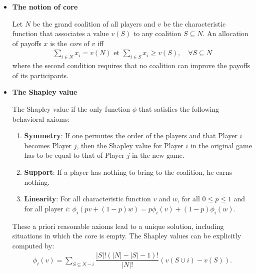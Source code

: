 \documentclass{../ape}
\begin{document}
\begin{itemize}[leftmargin=*]
\renewcommand{\labelitemi}{$\bullet$}

	
	\item \textbf{The notion of core}
	\vspace{.3cm}

	Let $N$ be the grand coalition of all players and $v$ be the characteristic function that associates a value $v (S)$ to any coalition $S \subseteq N$. An allocation of payoffs $x$ is the \emph{core} of $v$ iff
	\begin{align*}
		\sum_{i \in N}{x_i} = v(N) \text{ et } \sum_{i\in S}{x_i} \geq v(S), \quad \forall S \subseteq N
	\end{align*} 
	where the second condition requires that no coalition can improve the payoffs of its participants.

	\vspace{.3cm}
	\item \textbf{The Shapley value}
	\vspace{.3cm}
	
	The Shapley value if the only function $\phi$ that satisfies the following behavioral axioms:
	\begin{enumerate}
		\item \textbf{Symmetry}: If one permutes the order of the players and that Player $i$ becomes Player $j$, then the Shapley value for Player $i$ in the original game has to be equal to that of Player $j$ in the new game.
		\item \textbf{Support}: If a player has nothing to bring to the coalition, he earns nothing.
		\item \textbf{Linearity}: For all characteristic function $v$ and $w$, for all $0 \leq p \leq 1$ and for all player $i$: $\phi_i(pv + (1-p)w) = p\phi_i(v) + (1-p)\phi_i(w)$.
	\end{enumerate}
	These a priori reasonable axioms lead to a unique solution, including situations in which the core is empty. The Shapley values can be explicitly computed by:
	\begin{align*}
		\phi_i(v) = \sum_{S \subseteq N -i}{\dfrac{|S|!(|N| - |S| - 1)!}{|N|!} (v(S \cup {i}) - v(S))}.
	\end{align*}
	
\end{itemize}
\end{document}
